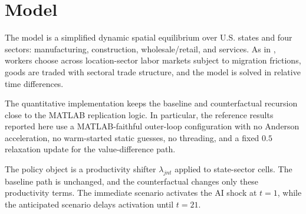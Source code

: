 \section{Model}

The model is a simplified dynamic spatial equilibrium over U.S. states and four sectors:
manufacturing, construction, wholesale/retail, and services. As in \citet{caliendo2019trade},
workers choose across location-sector labor markets subject to migration frictions, goods are
traded with sectoral trade structure, and the model is solved in relative time differences.

The quantitative implementation keeps the baseline and counterfactual recursion close to the
MATLAB replication logic. In particular, the reference results reported here use a
MATLAB-faithful outer-loop configuration with no Anderson acceleration, no warm-started static
guesses, no threading, and a fixed $0.5$ relaxation update for the value-difference path.

The policy object is a productivity shifter $\lambda_{jnt}$ applied to state-sector cells. The
baseline path is unchanged, and the counterfactual changes only these productivity terms. The
immediate scenario activates the AI shock at $t=1$, while the anticipated scenario delays
activation until $t=21$.
